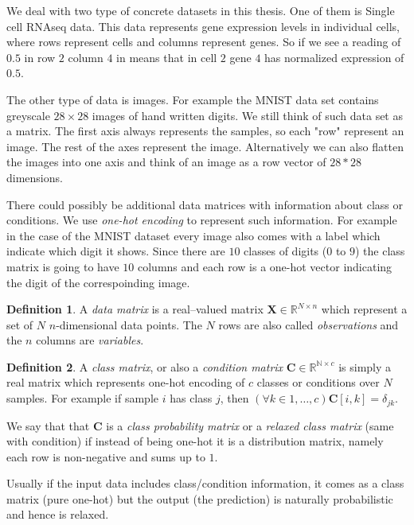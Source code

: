 \documentclass[11pt, a4paper]{report}
\theoremstyle{plain}
\theoremstyle{definition}
\newtheorem{mydef}{Definition}[chapter]
\theoremstyle{remark}
\newcommand{\N}{\mathbb{N}}
\newcommand{\R}{\mathbb{R}}
\newcommand{\bv}[1]{\boldsymbol{#1}}
\begin{document}
We deal with two type of concrete datasets in this thesis. One of them is
Single cell RNAseq data. This data represents gene expression levels in 
individual cells, where rows represent cells and columns represent genes.
So if we see a reading of
$0.5$ in row $2$ column $4$ in means that in cell $2$ gene $4$ has normalized
expression of $0.5$.

The other type of data is images. For example the MNIST data set contains 
greyscale $28 \times 28$ images of hand written digits.
We still think of such data set as a matrix. The first axis always represents
the samples, so each "row" represent an image. The rest of the axes represent
the image. Alternatively we can also flatten the images into one axis and think
of an image as a row vector of $28*28$ dimensions.

There could possibly be additional data matrices with information about
class or conditions. We use \emph{one-hot encoding} to represent such
information.
For example in the case of the MNIST dataset every image also comes with a label
which indicate which digit it shows. Since there are $10$ classes of digits ($0$
to $9$) the class matrix is going to have $10$ columns and each row is a one-hot
vector indicating the digit of the correspoinding image.

\begin{mydef}
\label{def:datamatrix}
A \emph{data matrix} is a real--valued matrix $\bv{X} \in \R^{N \times n}$
which represent a set of $N$ $n$-dimensional data points.
The $N$ rows are also called \emph{observations} and the $n$ columns are
\emph{variables}.
\end{mydef}

\begin{mydef}
\label{def:classmatrix}
A \emph{class matrix}, or also a \emph{condition matrix}
$\bv{C} \in \R^{\N \times c}$ is simply a real matrix which
represents one-hot encoding of $c$ classes or conditions over $N$ samples.
For example if sample $i$ has class $j$, then 
$(\forall k\in 1, \dots, c) \bv{C}[i,k] = \delta_{jk}$.

We say that that $\bv{C}$ is a \emph{class probability matrix} or a \emph{relaxed
class matrix} (same with condition)
if instead of being one-hot it is a distribution matrix, namely each row is
non-negative and sums up to $1$.
\end{mydef}

Usually if the input data includes class/condition information, it comes as a
class matrix (pure one-hot) but the output (the prediction) is naturally 
probabilistic and hence is relaxed.
\end{document}
